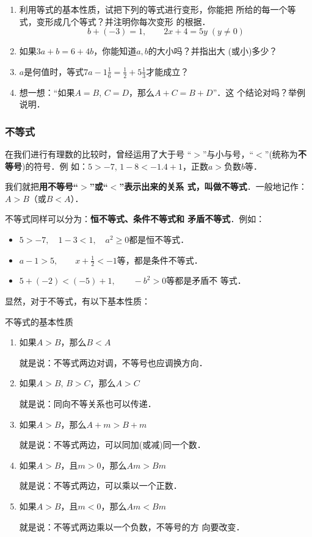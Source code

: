\begin{ex}
 \begin{enumerate}
     \item 利用等式的基本性质，试把下列的等式进行变形，你能把
     所给的每一个等式，变形成几个等式？并注明你每次变形
     的根据．
    \[b+(-3)=1,\qquad 2x+4=5y\; (y\ne 0) \]
     \item 如果$3a+b=6+4b$，你能知道$a,b$的大小吗？并指出大
       (或小)多少？
      \item $a$是何值时，等式$7a-1\frac{1}{6}=\frac{1}{2}+5\frac{1}{3}$才能成立？

   \item 想一想：“如果$A=B$, $C=D$，那么$A+C=B+D$”．这
     个结论对吗？举例说明．
 \end{enumerate}   
\end{ex}

\subsubsection{不等式}
在我们进行有理数的比较时，曾经运用了大于号
“$>$”与小与号，“$<$”(统称为\textbf{不等号})的符号．例
如：$5>-7$,  $1-8<-1.4+1$，正数$a>$负数$b$等．

我们就把\textbf{用不等号“$>$”或“$<$”表示出来的关系
式，叫做不等式}．一般地记作：$A>B$（或$B<A$）．

不等式同样可以分为：\textbf{恒不等式、条件不等式和
矛盾不等式}．例如：
\begin{itemize}
    \item $5>-7,\quad   1-3<1,\quad a^2\ge 0$都是恒不等式．
    \item $a-1 >5,\qquad x+\frac{1}{2}<-1$等，都是条件不等式．
    \item $5+ (-2)<(-5)+1,\qquad -b^2>0$等都是矛盾不
等式．
\end{itemize}
      
    显然，对于不等式，有以下基本性质：

\begin{blk}{不等式的基本性质}
    \begin{enumerate}
        \item 如果$A>B$，那么$B<A$
    
        就是说：不等式两边对调，不等号也应调换方向．
    
        \item 如果$A>B$, $B>C$，那么$A>C$
        
        就是说：同向不等关系也可以传递．
        
        \item 如果$A>B$，那么$A+m>B+m$
    
        就是说：不等式两边，可以同加(或减)同一个数．
    \item 如果$A>B$，且$m>0$，那么$Am>Bm$
    
        就是说：不等式两边，可以乘以一个正数．
        \item 如果$A>B$，且$m<0$，那么$Am < Bm$
        
        就是说：不等式两边乘以一个负数，不等号的方
    向要改变．
    \end{enumerate}
\end{blk}

